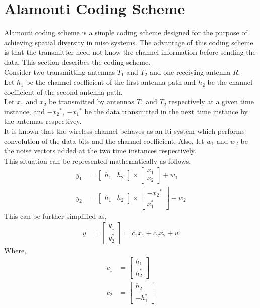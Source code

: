 \section{Alamouti Coding Scheme}
Alamouti coding scheme is a simple coding scheme designed for the purpose of achieving \gls{spatial diversity} in \acrshort{miso} systems. The advantage of this coding scheme is that the transmitter need not know the channel information before sending the data. This section describes the coding scheme.\\
Consider two transmitting antennas $T_1$ and $T_2$ and one receiving antenna $R$.\\
Let $h_1$ be the channel coefficient of the first antenna path and $h_2$ be the channel coefficient of the second antenna path.\\
Let $x_1$ and $x_2$ be transmitted by antennas $T_1$ and $T_2$ respectively at a given time instance, and ${-x_2}^*$, ${-x_1}^*$ be the data transmitted in the next time instance by the antennas respectivey.\\
It is known that the wireless channel behaves as an \acrshort{lti} system which performs convolution of the data bits and the channel coefficient. Also, let $w_1$ and $w_2$ be the noise vectors added at the two time instances respectively.\\
This situation can be represented mathematically as follows.
\begin{align}
y_1 &= 
\begin{bmatrix}
h_1&h_2
\end{bmatrix}
\times
\begin{bmatrix}
x_1\\
x_2
\end{bmatrix}
+ w_1\\
y_2 &=
\begin{bmatrix}
h_1&h_2
\end{bmatrix}
\times
\begin{bmatrix}
{-x_2}^*\\
x_1^*
\end{bmatrix}
+w_2
\end{align}
This can be further simplified as,\\
\begin{align}
y &= \begin{bmatrix}
y_1\\
y_2^*
\end{bmatrix}
= c_1x_1 + c_2x_2 + w
\end{align}
Where,
\begin{align}
c_1&=\begin{bmatrix}
h_1\\
h_2^*
\end{bmatrix}\\
c_2&=\begin{bmatrix}
h_2\\
-h_1^*
\end{bmatrix}
\end{align}
